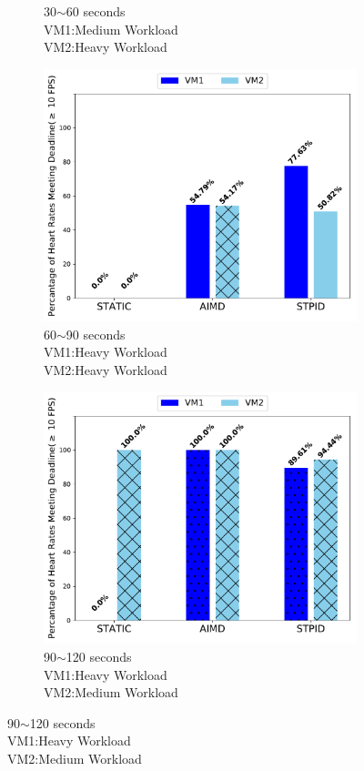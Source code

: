\begin{figure}[ht!]
\begin{subfigure}{.45\textwidth}
    \caption{30$\sim$60 seconds\\VM1:Medium Workload \\VM2:Heavy Workload} 
    \label{2vm_r2}
\end{subfigure}%

\begin{subfigure}{.45\textwidth}
    \centering
    \includegraphics[width=1\linewidth]{images/2vm_r3} 
    \captionsetup{justification=centering}

 \caption{60$\sim$90 seconds\\VM1:Heavy Workload \\VM2:Heavy Workload} 

    \label{2vm_r3}
\end{subfigure}
\begin{subfigure}{.45\textwidth}
    \centering
    \includegraphics[width=1\linewidth]{images/2vm_r4} 
    \captionsetup{justification=centering}
 \caption{90$\sim$120 seconds\\VM1:Heavy Workload \\VM2:Medium Workload} 
    \label{2vm_r4}
\end{subfigure}%


\end{figure}
